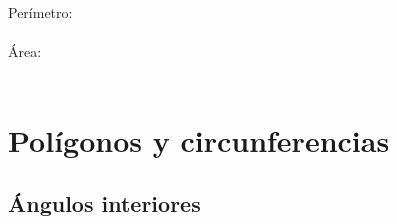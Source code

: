 \documentclass[12pt,addpoints,answers]{repaso}
\begin{document}
\begin{questions}
{\begin{multicols}{3}
\begin{parts}
                Perímetro: \\
                \fillin[$P=2\pi r=2(3.14)10=62.8$][0in] \\
                 Área: \\
                 \fillin[$A=\pi r^2=(3.14)10^2=314$][0in] \\

            \end{parts}
        \end{multicols}
    }

    \section{Polígonos y circunferencias}
    \subsection{Ángulos interiores}

\end{questions}
\end{document}
